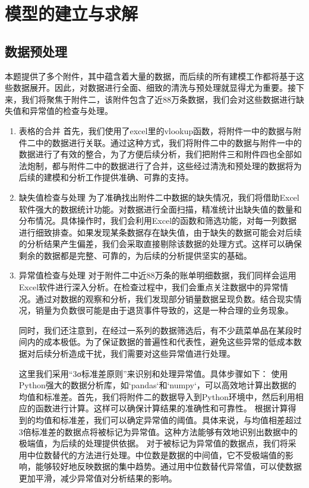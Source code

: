 \documentclass{cumcmthesis} %
\begin{document}
\section{模型的建立与求解}

\subsection{数据预处理}
本题提供了多个附件，其中蕴含着大量的数据，而后续的所有建模工作都将基于这些数据展开。因此，对数据进行全面、细致的清洗与预处理就显得尤为重要。接下来，我们将聚焦于附件二，该附件包含了近88万条数据，我们会对这些数据进行缺失值和异常值的检查与处理。

\begin{enumerate}
    \item 表格的合并
    首先，我们使用了excel里的vlookup函数，将附件一中的数据与附件二中的数据进行关联。通过这种方式，我们将附件二中的数据与附件一中的数据进行了有效的整合，为了方便后续分析，我们把附件三和附件四也全部如法炮制，都与附件二中的数据进行了合并，这些经过清洗和预处理的数据将为后续的建模和分析工作提供准确、可靠的支持。        
    
    \item 缺失值检查与处理
    为了准确找出附件二中数据的缺失情况，我们将借助Excel软件强大的数据统计功能。对数据进行全面扫描，精准统计出缺失值的数量和分布情况。具体操作时，我们会利用Excel的函数和筛选功能，对每一列数据进行细致排查。如果发现某条数据存在缺失值，由于缺失的数据可能会对后续的分析结果产生偏差，我们会采取直接剔除该数据的处理方式。这样可以确保剩余的数据都是完整、可靠的，为后续的分析提供坚实的基础。
    
    \item 异常值检查与处理
    对于附件二中近88万条的账单明细数据，我们同样会运用Excel软件进行深入分析。在检查过程中，我们会重点关注数据中的异常情况。通过对数据的观察和分析，我们发现部分销量数据呈现负数。结合现实情况，销量为负数很可能是由于退货事件导致的，这是一种合理的业务现象。

同时，我们还注意到，在经过一系列的数据筛选后，有不少蔬菜单品在某段时间内的成本极低。为了保证数据的普遍性和代表性，避免这些异常的低成本数据对后续分析造成干扰，我们需要对这些异常值进行处理。

这里我们采用“3σ标准差原则”来识别和处理异常值。具体步骤如下：
使用Python强大的数据分析库，如`pandas`和`numpy`，可以高效地计算出数据的均值和标准差。首先，我们将附件二的数据导入到Python环境中，然后利用相应的函数进行计算。这样可以确保计算结果的准确性和可靠性。
根据计算得到的均值和标准差，我们可以确定异常值的阈值。具体来说，与均值相差超过3倍标准差的数据点将被标记为异常值。这种方法能够有效地识别出数据中的极端值，为后续的处理提供依据。
对于被标记为异常值的数据点，我们将采用中位数替代的方法进行处理。中位数是数据的中间值，它不受极端值的影响，能够较好地反映数据的集中趋势。通过用中位数替代异常值，可以使数据更加平滑，减少异常值对分析结果的影响。

\end{enumerate}
\end{document}
